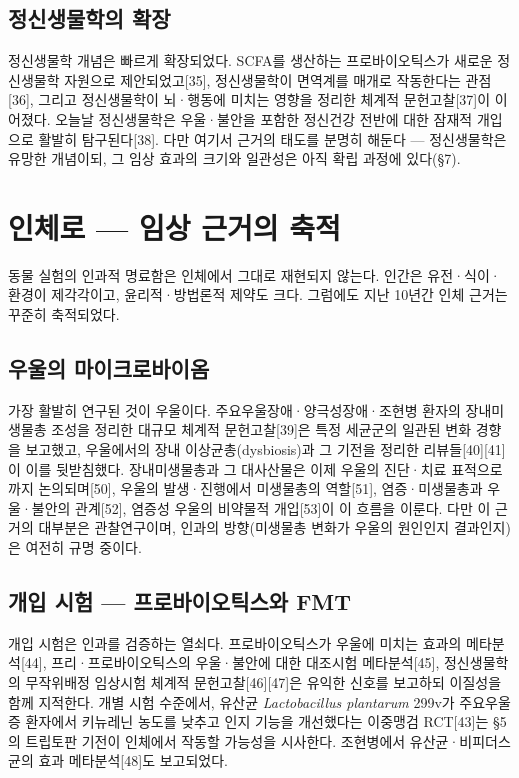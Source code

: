 \documentclass[11pt,oneside]{book}
\begin{document}
\subsection{정신생물학의 확장}
정신생물학 개념은 빠르게 확장되었다. SCFA를 생산하는 프로바이오틱스가 새로운 정신생물학 자원으로 제안되었고[35], 정신생물학이 면역계를 매개로 작동한다는 관점[36], 그리고 정신생물학이 뇌·행동에 미치는 영향을 정리한 체계적 문헌고찰[37]이 이어졌다. 오늘날 정신생물학은 우울·불안을 포함한 정신건강 전반에 대한 잠재적 개입으로 활발히 탐구된다[38]. 다만 여기서 근거의 태도를 분명히 해둔다 — 정신생물학은 유망한 개념이되, 그 임상 효과의 크기와 일관성은 아직 확립 과정에 있다(§7).

\section{인체로 — 임상 근거의 축적}
동물 실험의 인과적 명료함은 인체에서 그대로 재현되지 않는다. 인간은 유전·식이·환경이 제각각이고, 윤리적·방법론적 제약도 크다. 그럼에도 지난 10년간 인체 근거는 꾸준히 축적되었다.

\subsection{우울의 마이크로바이옴}
가장 활발히 연구된 것이 우울이다. 주요우울장애·양극성장애·조현병 환자의 장내미생물총 조성을 정리한 대규모 체계적 문헌고찰[39]은 특정 세균군의 일관된 변화 경향을 보고했고, 우울에서의 장내 이상균총(dysbiosis)과 그 기전을 정리한 리뷰들[40][41]이 이를 뒷받침했다. 장내미생물총과 그 대사산물은 이제 우울의 진단·치료 표적으로까지 논의되며[50], 우울의 발생·진행에서 미생물총의 역할[51], 염증·미생물총과 우울·불안의 관계[52], 염증성 우울의 비약물적 개입[53]이 이 흐름을 이룬다. 다만 이 근거의 대부분은 관찰연구이며, 인과의 방향(미생물총 변화가 우울의 원인인지 결과인지)은 여전히 규명 중이다.

\subsection{개입 시험 — 프로바이오틱스와 FMT}
개입 시험은 인과를 검증하는 열쇠다. 프로바이오틱스가 우울에 미치는 효과의 메타분석[44], 프리·프로바이오틱스의 우울·불안에 대한 대조시험 메타분석[45], 정신생물학의 무작위배정 임상시험 체계적 문헌고찰[46][47]은 유익한 신호를 보고하되 이질성을 함께 지적한다. 개별 시험 수준에서, 유산균 \textit{Lactobacillus plantarum} 299v가 주요우울증 환자에서 키뉴레닌 농도를 낮추고 인지 기능을 개선했다는 이중맹검 RCT[43]는 §5의 트립토판 기전이 인체에서 작동할 가능성을 시사한다. 조현병에서 유산균·비피더스균의 효과 메타분석[48]도 보고되었다.
\end{document}
